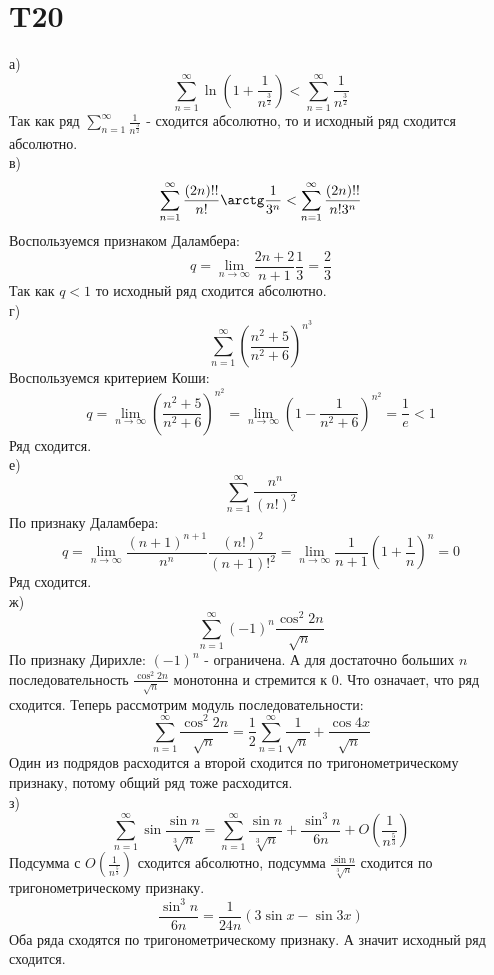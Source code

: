 \documentclass[12pt]{article}
\begin{document}
\section{T20}
а)
\[
    \sum_{n=1}^{\infty} \ln (1 + \frac{1}{n^{\frac{3}{2}}}) < \sum_{n=1}^{\infty} \frac{1}{n^{\frac{3}{2}}}
\]
Так как ряд $\sum_{n=1}^{\infty} \frac{1}{n^{\frac{3}{2}}}$ - сходится абсолютно, то и исходный ряд сходится абсолютно.\\
в)
\[
    \sum_{n=1}^{\infty} \frac{(2n)!!}{n!} \arctg \frac{1}{3^n} < \sum_{n=1}^{\infty} \frac{(2n)!!}{n! 3^n}
\]
Воспользуемся признаком Даламбера:
\[
    q = \lim_{n \to \infty} \frac{2n + 2}{n + 1} \frac{1}{3} = \frac{2}{3}
\]
Так как $q < 1$ то исходный ряд сходится абсолютно. \\
г) 
\[
    \sum_{n=1}^{\infty} \left( \frac{n^2 + 5}{n^2 + 6} \right)^{n^3}
\]
Воспользуемся критерием Коши:
\[
    q = \lim_{n \to \infty} \left( \frac{n^2 + 5}{n^2 + 6} \right)^{n^2} = \lim_{n \to \infty} \left( 1 - \frac{1}{n^2 + 6} \right)^{n^{2}} = \frac{1}{e} < 1
\]
Ряд сходится. \\
е)
\[
    \sum_{n=1}^{\infty} \frac{n^n}{(n!)^2}
\]
По признаку Даламбера: 
\[
    q = \lim_{n \to \infty} \frac{(n + 1)^{n+1}}{n^n} \frac{(n!)^2}{(n+1)!^2} = 
    \lim_{n \to \infty} \frac{1}{n+1} (1 + \frac{1}{n})^n = 0
\]
Ряд сходится.
\\
ж)
\[
    \sum_{n=1}^{\infty} (-1)^n \frac{\cos^2 2n}{\sqrt{n}}
\]
По признаку Дирихле: $(-1)^n $ - ограничена. А для достаточно больших $n$ последовательность 
$\frac{\cos ^2 2n}{\sqrt{n} }$ монотонна и стремится к 0. 
Что означает, что ряд сходится. Теперь рассмотрим модуль последовательности:
\[
    \sum_{n=1}^{\infty} \frac{\cos ^2 2n}{\sqrt{n} } = 
    \frac{1}{2}\sum_{n=1}^{\infty} \frac{1}{\sqrt{n}} + \frac{\cos 4x}{\sqrt{n} }
\]
Один из подрядов расходится а второй сходится по тригонометрическому признаку, потому общий ряд тоже расходится.
\\
з) 
\[
    \sum_{n=1}^{\infty} \sin \frac{\sin n}{\sqrt[3]{n}} = \sum_{n=1}^{\infty} \frac{\sin n}{\sqrt[3]{n}} + \frac{\sin^3 n}{6n} + O(\frac{1}{n^{\frac{5}{3}}})
\]
Подсумма с $O(\frac{1}{n^{\frac{5}{3}}})$ сходится абсолютно, подсумма $\frac{\sin n}{\sqrt[3]{n}}$ сходится по тригонометрическому признаку.
\[
    \frac{\sin^3 n}{6n} = \frac{1}{24n} \left( 3\sin x - \sin 3x \right) 
\]
Оба ряда сходятся по тригонометрическому признаку. А значит исходный ряд сходится.
\end{document}
